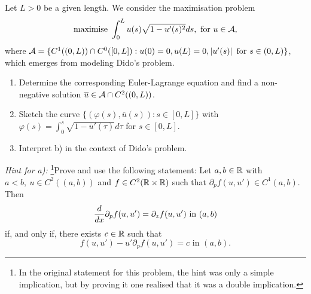 \begin{ex}

  Let $L > 0$ be a given length. We consider the maximisation problem
  \[
    \text{maximise } \int_0^L u(s)\sqrt{1 - u'(s)^2}ds, \text{ for } u \in \mathcal{A},
  \]
  where $\mathcal{A} = \{C^1((0, L)) \cap C^0([0, L]) : u(0) = 0, u(L) = 0,
  \left\vert{u'(s)}\right\vert \text{ for } s \in (0, L)\}$, which emerges from modeling Dido's
  problem.

  \begin{enumerate}
    \item Determine the corresponding Euler-Lagrange equation and find a
      non-negative solution $\overline{u} \in \mathcal{A} \cap C^2((0, L))$.
    \item Sketch the curve $\{(\varphi(s), \overline{u}(s)) : s \in [0, L]\}$
      with $\varphi(s) = \int_0^s \sqrt{1 - \overline{u}'(\tau)}d\tau$ for $s
      \in [0, L]$.
    \item Interpret b) in the context of Dido's problem.
  \end{enumerate}

  \textit{Hint for a):} \footnote{In the original statement for this problem,
  the hint was only a simple implication, but by proving it one realised that
it was a double implication.}Prove and use the following statement: Let $a, b
\in \mathbb{R}$ with $a < b,\ u \in C^2((a, b))$ and $f \in C^2(\mathbb{R} \times \mathbb{R})$ such
that $\partial_p f(u, u') \in C^1(a, b)$. Then
  \[
    \frac{d}{dx} \partial_p f(u, u') = \partial_z f(u, u')\text{ in } (a, b)
  \]
  if, and only if, there exists $c \in \mathbb{R}$ such that
  \[
    f(u, u') - u' \partial_p f(u, u') = c\text{ in } (a, b).
  \]
\end{ex}

